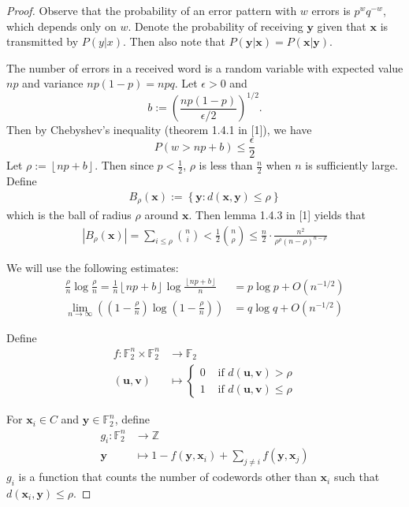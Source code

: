 \documentclass{article}
\renewcommand{\tt}[1]{\text{ #1 }}
\newcommand{\Z}{\mathbb{Z}}
\newcommand{\F}{\mathbb{F}}
\newcommand{\mt}{\mapsto}
\newcommand{\floor}[1]{\left\lfloor #1 \right\rfloor}
\renewcommand{\=}{\equiv}
\newcommand{\ra}{\rightarrow}
\newcommand{\ass}[1]{\left( #1 \right)}
\newcommand{\set}[1]{\left\{ #1 \right\}}
\renewcommand{\v}{\mathbf}
\newcommand{\x}{{\v x}}
\newcommand{\y}{{\v y}}
\theoremstyle{plain}
\theoremstyle{definition}
\begin{document}
\begin{proof}
Observe that the probability of an error pattern with $w$ errors is $p^w q^{-w}$, which depends only on $w$.
Denote the probability of receiving $\y$ given that $\x$ is transmitted by $P(y|x)$.
Then also note that $P(\y|\x) = P(\x|\y)$.

The number of errors in a received word is a random variable with expected value $np$ and variance $np(1-p) = npq$.
Let $\epsilon > 0$ and
$$ b := \ass{\frac{np(1-p)}{\epsilon/2}}^{1/2}. $$
Then by Chebyshev's inequality (theorem 1.4.1 in [1]), we have
\begin{equation} \label{eq:cheby}
  P(w > np + b) \leq \frac{\epsilon}{2}
\end{equation}
Let $\rho := \floor{np + b}$.
Then since $p < \frac 1 2$, $\rho$ is less than $\frac{n}{2}$ when $n$ is sufficiently large.
Define
\begin{align}
  B_\rho(\x) := \set{ \y : d(\x, \y) \leq \rho }
\end{align}
which is the ball of radius $\rho$ around $\v x$.
Then lemma 1.4.3 in [1] yields that
\begin{align}
  |B_\rho(\x)| = \sum_{i \leq \rho} \binom{n}{i} < \frac{1}{2} \binom{n}{\rho} \leq \frac{n}{2} \cdot \frac{n^2}{\rho^\rho(n - \rho)^{n - \rho}}
\end{align}

We will use the following estimates:
\begin{align} \label{eq:estimates}
  \frac{\rho}{n} \log \frac{\rho}{n} = \frac{1}{n} \floor{np + b} \log \frac{\floor{np + b}}{n}
  &= p \log p + O(n^{-1/2}) \\
  \lim_{n \ra \infty} \ass{\ass{1 - \frac{\rho}{n}} \log \ass{1 - \frac{\rho}{n}}}
  &= q \log q + O(n^{-1/2})
\end{align}

Define
\begin{align}
  f :
  \F_2^n \times \F_2^n &\ra \F_2 \\
  (\v u, \v v) &\mt \begin{cases}
    0 &\tt{if} d(\v u, \v v) > \rho \\
    1 &\tt{if} d(\v u, \v v) \leq \rho
  \end{cases}
\end{align}

For $\x_i \in C$ and $\y \in \F_2^n$, define
\begin{align*}
  g_i :
  \F_2^n &\ra \Z \\
  \y &\mt 1 - f(\y, \x_i) + \sum_{j \neq i} f(\v y, \x_j)
\end{align*}
$g_i$ is a function that counts the number of codewords other than $\x_i$ such that $d(\x_i, \y) \leq \rho$.


\end{proof}
\end{document}
